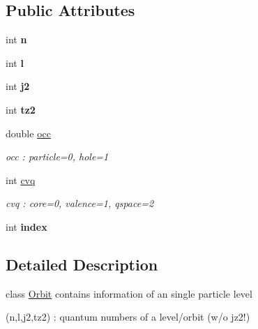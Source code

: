 \subsection*{Public Attributes}
\begin{DoxyCompactItemize}
\item 
\mbox{\label{classOrbit_a61c756b2fd626b9222fea5a2b4622eca}} 
int {\bfseries n}
\item 
\mbox{\label{classOrbit_a3b03c063df7856524db81274331d0e4b}} 
int {\bfseries l}
\item 
\mbox{\label{classOrbit_a039f1fb20d41a2227bb61c2078e67d8b}} 
int {\bfseries j2}
\item 
\mbox{\label{classOrbit_a9f9a4be881aa8b960b43fb3171617816}} 
int {\bfseries tz2}
\item 
\mbox{\label{classOrbit_a68ea77afa00c23030e1c4260ff64dcbc}} 
double \hyperlink{classOrbit_a68ea77afa00c23030e1c4260ff64dcbc}{occ}
\begin{DoxyCompactList}\small\item\em occ \+: particle=0, hole=1 \end{DoxyCompactList}\item 
\mbox{\label{classOrbit_a75cb422d6cd5fcc04ca5e2dc2c1e1d4e}} 
int \hyperlink{classOrbit_a75cb422d6cd5fcc04ca5e2dc2c1e1d4e}{cvq}
\begin{DoxyCompactList}\small\item\em cvq \+: core=0, valence=1, qspace=2 \end{DoxyCompactList}\item 
\mbox{\label{classOrbit_aee34aabfabd6d77cb0cc55f591a6493c}} 
int {\bfseries index}
\end{DoxyCompactItemize}


\subsection{Detailed Description}
class \hyperlink{classOrbit}{Orbit} contains information of an single particle level

(n,l,j2,tz2) \+: quantum numbers of a level/orbit (w/o jz2!)

